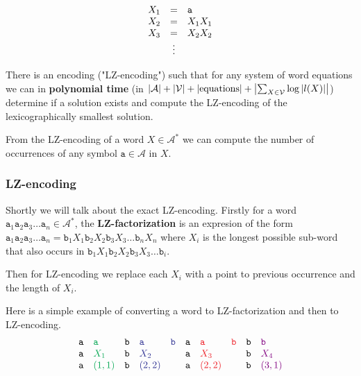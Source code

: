 $$
\begin{array}{r c l}
	X_1 &=& \mathtt{a} \\
	X_2 &=& X_1 X_1 \\
	X_3 &=& X_2 X_2 \\
	&\vdots&
\end{array}
$$

\begin{fact}
	There is an encoding ("LZ-encoding") such that for any system of word equations we can in \textbf{polynomial time} (in $\left|{\mathcal{A}}\right| + \left|{\mathcal{V}}\right| + \left|{\text{equations}}\right| + \left|{\sum_{X \in \mathcal{V}} \log |l(X)|}\right|$) determine if a solution exists and compute the LZ-encoding of the lexicographically smallest solution.
\end{fact}

\begin{fact}
	From the LZ-encoding of a word $X \in \mathcal{A}^{\ast}$ we can compute the number of occurrences of any symbol $\mathtt{a} \in \mathcal{A}$ in $X$.
\end{fact}

\subsubsection{LZ-encoding}

Shortly we will talk about the exact LZ-encoding. Firstly for a word $\mathtt{a}_1 \mathtt{a}_2 \mathtt{a}_3 \dots \mathtt{a}_n \in \mathcal{A}^\ast$, the \textbf{LZ-factorization} is an expresion of the form $\mathtt{a}_1 \mathtt{a}_2 \mathtt{a}_3 \dots \mathtt{a}_{n} = \mathtt{b}_1 X_1 \mathtt{b}_2 X_2 \mathtt{b}_3 X_3 \dots \mathtt{b}_n X_n$ where $X_i$ is the longest possible sub-word that also occurs in $\mathtt{b}_1 X_1 \mathtt{b}_2 X_2 \mathtt{b}_3 X_3 \dots \mathtt{b}_i$.

Then for LZ-encoding we replace each $X_i$ with a point to previous occurrence and the length of $X_i$.

\begin{example}
	Here is a simple example of converting a word to LZ-factorization and then to LZ-encoding.
	$$
	\begin{array}{l l l l l l l l l l}
		\mathtt{a}&\textcolor{Green}{\mathtt{a}}&\mathtt{b}&\textcolor{Blue}{\mathtt{a}}&\textcolor{Blue}{\mathtt{b}}&\mathtt{a}&\textcolor{Red}{\mathtt{a}}&\textcolor{Red}{\mathtt{b}}&\mathtt{b}&\textcolor{violet}{\mathtt{b}}\\
		\mathtt{a}&\textcolor{Green}{X_1}       &\mathtt{b}&\textcolor{Blue}{X_2}       &                            &\mathtt{a}&\textcolor{Red}{X_3}       &                           &\mathtt{b}&\textcolor{violet}{X_4}\\
		\mathtt{a}&\textcolor{Green}{(1,1)}     &\mathtt{b}&\textcolor{Blue}{(2,2)}     &                            &\mathtt{a}&\textcolor{Red}{(2,2)}     &                           &\mathtt{b}&\textcolor{violet}{(3,1)}\\
	\end{array}
	$$
\end{example}

